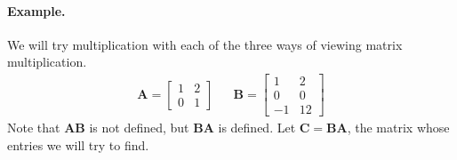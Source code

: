 \documentclass[11pt]{article}
\newcommand{\mat}[1]{\mathbf{#1}}
\begin{document}
\paragraph{Example.} We will try multiplication with each of the three ways of viewing matrix multiplication.
\begin{align*}
\mat{A} = \begin{bmatrix}1&2\\0&1\end{bmatrix}
&&
\mat{B} = \begin{bmatrix}1&2\\0&0\\-1&12\end{bmatrix}
\end{align*}
Note that $\mat{A} \mat{B}$ is not defined, but $\mat{B} \mat{A}$ is defined. Let $\mat{C} = \mat{B} \mat{A}$, the matrix whose entries we will try to find.
\end{document}
